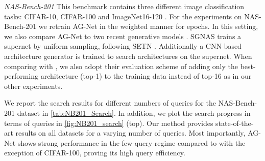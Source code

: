 \documentclass[runningheads]{llncs}
\begin{document}
\noindent \textit{NAS-Bench-201}
This benchmark contains three different image classification tasks:
CIFAR-10, CIFAR-100 \cite{2009CIFAR} and ImageNet16-120 \cite{2017ImageNet16}.
For the experiments on NAS-Bench-201\cite{2020NB201} we retrain AG-Net in the weighted manner for  epochs.
In this setting, we also compare AG-Net to two recent generative models \cite{2021GANAS,2021SGNAS}.
SGNAS \cite{2021SGNAS} trains a supernet by uniform sampling, following SETN \cite{2019SETN}. Additionally a CNN based architecture generator is trained to search architectures on the supernet.
When comparing with \cite{2020Arch2vec}, we also adopt their evaluation scheme of adding only the best-performing architecture (top-1) to the training data instead of top-16 as in our other experiments.

We report the search results for different numbers of queries for the NAS-Bench-201 dataset in \autoref{tab:NB201_Search}.
In addition, we plot the search progress in terms of queries in \autoref{fig:NB201_search} (top).
Our method provides state-of-the-art results on all datasets for a varying number of queries.
Most importantly, AG-Net shows strong performance in the few-query regime compared to \cite{2020Arch2vec} with the exception of CIFAR-100, proving its high query efficiency.
\end{document}
